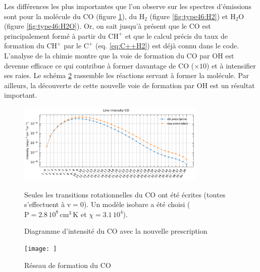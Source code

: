 Les différences les plus importantes que l'on observe sur les spectres d'émissions sont pour la molécule du $\mathrm{CO}$ (figure \ref{fig:type46:CO}), du $\mathrm{H}_2$ (figure \ref{fig:type46:H2}) et $\mathrm{H}_2\mathrm{O}$ (figure \ref{fig:type46:H2O}). Or, on sait jusqu'à présent que le $\mathrm{CO}$ est principalement formé à partir du $\mathrm{CH}^+$ et que le calcul précis du taux de formation du $\mathrm{CH}^+$ par le $\mathrm{C}^+$ (eq. \ref{eq:C++H2}) est déjà connu dans le code. L'analyse de la chimie montre que la voie de formation du $\mathrm{CO}$ par $\mathrm{OH}$ est devenue efficace ce qui contribue à former davantage de $\mathrm{CO}$ ($\times 10$) et à intensifier ses raies. Le schéma \ref{fig:type46:form:CO} rassemble les réactions servant à former la molécule. Par ailleurs, la découverte de cette nouvelle voie de formation par $\mathrm{OH}$ est un résultat important. 

\begin{figure}[!h]
    \centering \includegraphics[trim = {0 0 0 1cm},clip,width=0.8\textwidth]{figure/type46/I_comp_CO.pdf}
    \caption{Diagramme d'intensité du $\mathrm{CO}$ avec la nouvelle prescription}
    \begin{minipage}{\textwidth}
    Seules les transitions rotationnelles du $\mathrm{CO}$ ont été écrites (toutes s'effectuent à $\mathrm{v}=0$). Un modèle isobare a été choisi ($\mathrm{P} = 2.8\,10^{8} \,\mathrm{cm}^3\,\mathrm{K}$ et $\chi = 3.1\, 10^4$).
    \end{minipage}
    \label{fig:type46:CO}
\end{figure}

\begin{figure}[!h]
    \centering \texttt{[image: ]}
    \caption{Réseau de formation du $\mathrm{CO}$}
    \begin{minipage}{\textwidth}
    
    \end{minipage}
    \label{fig:type46:form:CO}
\end{figure}

